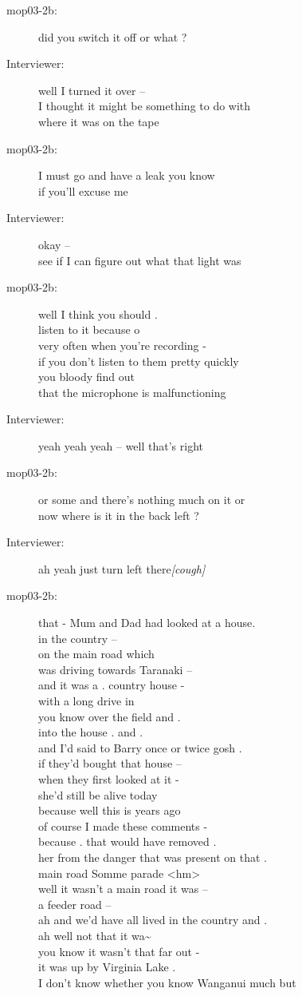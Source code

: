 \documentclass{article}
\newcommand{\turn}[2]{
\item[#1:] #2
}
\begin{document}
\begin{description}
\turn{mop03-2b}{did you switch it off or what ?}

\turn{Interviewer}{well I turned it over --\\
I thought it might be something to do with\\
where it was on the tape}

\turn{mop03-2b}{I must go and have a leak you know\\
if you'll excuse me}

\turn{Interviewer}{okay --\\
see if I can figure out what that light was}

\turn{mop03-2b}{well I think you should .\\
listen to it because o\\
very often when you're recording -\\
if you don't listen to them pretty quickly\\
you bloody find out\\
that the microphone is malfunctioning}

\turn{Interviewer}{yeah yeah yeah -- well that's right}

\turn{mop03-2b}{or some and there's nothing much on it or\\
now where is it in the back left ?}

\turn{Interviewer}{ah yeah just turn left there\textit{[cough]} \\
}

\turn{mop03-2b}{that - Mum and Dad had looked at a house.\\
in the country --\\
on the main road which\\
was driving towards Taranaki --\\
and it was a . country house -\\
with a long drive in\\
you know over the field and .\\
into the house . and .\\
and I'd said to Barry once or twice gosh .\\
if they'd bought that house --\\
when they first looked at it -\\
she'd still be alive today\\
because well this is years ago\\
of course I made these comments -\\
because . that would have removed .\\
her from the danger that was present on that .\\
main road Somme parade \textless hm\textgreater \\
well it wasn't a main road it was --\\
a feeder road --\\
ah and we'd have all lived in the country and .\\
ah well not that it wa\~{} \\
you know it wasn't that far out -\\
it was up by Virginia Lake .\\
I don't know whether you know Wanganui much but}


\end{description}
\end{document}
